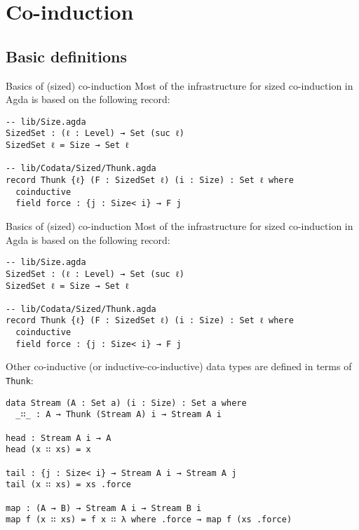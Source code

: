 \documentclass[t,aspectratio=169,9pt]{beamer}
\begin{document}
\section[coinduction]{Co-induction}
\subsection[coinduction]{Basic definitions}
\begin{frame}[fragile]{Basics of (sized) co-induction}
  Most of the infrastructure for sized co-induction in Agda is based on the
  following record:
\begin{verbatim}
-- lib/Size.agda
SizedSet : (ℓ : Level) → Set (suc ℓ)
SizedSet ℓ = Size → Set ℓ

-- lib/Codata/Sized/Thunk.agda
record Thunk {ℓ} (F : SizedSet ℓ) (i : Size) : Set ℓ where
  coinductive
  field force : {j : Size< i} → F j
\end{verbatim}
\end{frame}
\begin{frame}{Basics of (sized) co-induction}
  Most of the infrastructure for sized co-induction in Agda is based on the
  following record:
\begin{verbatim}
-- lib/Size.agda
SizedSet : (ℓ : Level) → Set (suc ℓ)
SizedSet ℓ = Size → Set ℓ

-- lib/Codata/Sized/Thunk.agda
record Thunk {ℓ} (F : SizedSet ℓ) (i : Size) : Set ℓ where
  coinductive
  field force : {j : Size< i} → F j
\end{verbatim}
Other co-inductive (or inductive-co-inductive) data types are defined in terms
of \texttt{Thunk}:
\begin{verbatim}
data Stream (A : Set a) (i : Size) : Set a where
  _∷_ : A → Thunk (Stream A) i → Stream A i

head : Stream A i → A
head (x ∷ xs) = x

tail : {j : Size< i} → Stream A i → Stream A j
tail (x ∷ xs) = xs .force

map : (A → B) → Stream A i → Stream B i
map f (x ∷ xs) = f x ∷ λ where .force → map f (xs .force)
\end{verbatim}
\end{frame}
\end{document}
